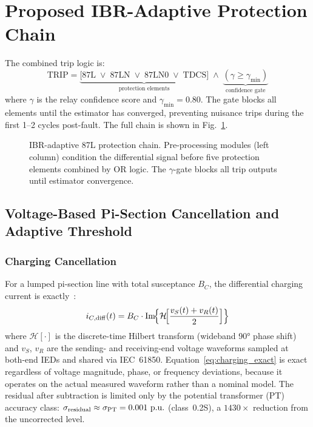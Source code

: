 \documentclass[journal,twoside,10pt]{IEEEtran}
\newcommand{\pu}{\,\text{p.u.}}
\begin{document}
\section{Proposed IBR-Adaptive Protection Chain}
\label{sec:chain}

The combined trip logic is:
\begin{equation}
  \mathrm{TRIP} =
  \underbrace{
    \bigl[87\text{L} \;\vee\; 87\text{LN} \;\vee\;
          87\text{LN0} \;\vee\; \text{TDCS}\bigr]
  }_{\text{protection elements}}
  \;\wedge\;
  \underbrace{(\gamma \geq \gamma_{\min})}_{\text{confidence gate}}
  \label{eq:combined}
\end{equation}
where $\gamma$ is the relay confidence score and $\gamma_{\min} = 0.80$.
The gate blocks all elements until the estimator has converged, preventing
nuisance trips during the first 1--2 cycles post-fault.
The full chain is shown in Fig.~\ref{fig:chain}.

\begin{figure}[!t]
  \centering
  
  \caption{IBR-adaptive 87L protection chain.
           Pre-processing modules (left column) condition the differential
           signal before five protection elements combined by OR logic.
           The $\gamma$-gate blocks all trip outputs until estimator convergence.}
  \label{fig:chain}
\end{figure}

\subsection{Voltage-Based Pi-Section Cancellation and Adaptive Threshold}
\label{sec:correction}

\subsubsection{Charging Cancellation}

For a lumped pi-section line with total susceptance $B_C$, the differential
charging current is exactly~\cite{Blackburn2006}:
\begin{equation}
  i_{C,\rm diff}(t) = B_C \cdot \mathrm{Im}\!\Bigl\{
    \mathcal{H}\!\Bigl[\frac{v_S(t)+v_R(t)}{2}\Bigr]\Bigr\}
  \label{eq:charging_exact}
\end{equation}
where $\mathcal{H}[\cdot]$ is the discrete-time Hilbert transform (wideband
90° phase shift) and $v_S$, $v_R$ are the sending- and receiving-end voltage
waveforms sampled at both-end IEDs and shared via IEC~61850.
Equation~\eqref{eq:charging_exact} is exact regardless of voltage magnitude,
phase, or frequency deviations, because it operates on the actual measured
waveform rather than a nominal model.  The residual after subtraction is
limited only by the potential transformer (PT) accuracy class:
$\sigma_{\rm residual} \approx \sigma_{\rm PT} = 0.001\,\pu$ (class~0.2S),
a $1430\times$ reduction from the uncorrected level.
\end{document}
